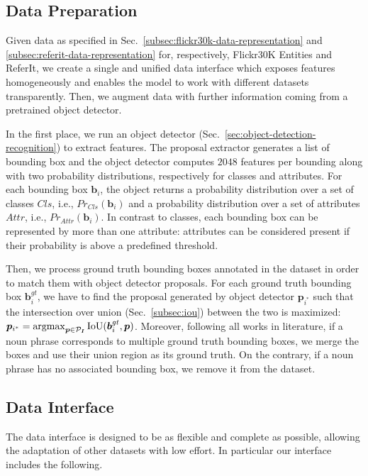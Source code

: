 \subsection{Data Preparation}
\label{subsec:data-preparation}

Given data as specified in
Sec.~\ref{subsec:flickr30k-data-representation} and
\ref{subsec:referit-data-representation} for, respectively, Flickr30K
Entities and ReferIt, we create a single and unified data interface
which exposes features homogeneously and enables the model to work
with different datasets transparently. Then, we augment data with
further information coming from a pretrained object detector.

In the first place, we run an object detector
(Sec.~\ref{sec:object-detection-recognition}) to extract features. The
proposal extractor generates a list of bounding box and the object
detector computes $2048$ features per bounding along with two
probability distributions, respectively for classes and attributes.
For each bounding box $\bm{b}_i$, the object returns a probability
distribution over a set of classes $Cls$, i.e., $Pr_{Cls}(\bm{b}_i)$
and a probability distribution over a set of attributes $Attr$, i.e.,
$Pr_{Attr}(\bm{b}_i)$. In contrast to classes, each bounding box can
be represented by more than one attribute: attributes can be
considered present if their probability is above a predefined
threshold.

Then, we process ground truth bounding boxes annotated in the dataset
in order to match them with object detector proposals. For each ground
truth bounding box $\bm{b}^{gt}_i$, we have to find the proposal
generated by object detector $\bm{p}_{i^*}$ such that the intersection
over union (Sec.~\ref{subsec:iou}) between the two is maximized:
$\bm{p}_{i^*} = \operatorname*{argmax}_{\bm{p} \in \mathcal{P}_{\bm{I}}}
\text{IoU}(\bm{b}^{gt}_i, \bm{p})$. Moreover, following all works in
literature, if a noun phrase corresponds to multiple ground truth
bounding boxes, we merge the boxes and use their union region as its
ground truth. On the contrary, if a noun phrase has no associated
bounding box, we remove it from the dataset.

\subsection{Data Interface}
\label{subsec:data-interface}

The data interface is designed to be as flexible and complete as
possible, allowing the adaptation of other datasets with low effort.
In particular our interface includes the following.

